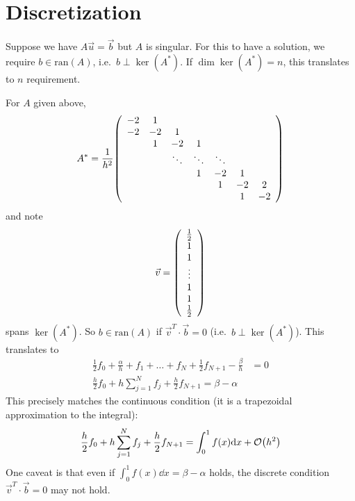 \documentclass{article}
\newcommand{\ran}{\text{ran}}
\begin{document}
    \section{Discretization}
        Suppose we have $A\vec{u} = \vec{b}$ but $A$ is singular.  For this to have a solution, we require $b \in \ran(A)$, i.e.~$b \perp \ker(A^*)$.  If $\dim\ker(A^*) = n$, this translates to $n$ requirement.

        For $A$ given above,
        \begin{align}
             A^* = \frac{1}{h^2}\qty(\begin{array}{ccccccc}
                    -2 & 1 & & & \\
                    -2 & -2 & 1 & & \\
                    & 1 & -2 & 1 \\
                    & & \ddots & \ddots & \ddots &  \\
                    & & & 1 & -2 & 1 \\
                    & & & & 1 & -2 & 2 \\
                    & & & & & 1 & -2
                \end{array})
        \end{align}
        and note
        \begin{align}
            \vec{v} = \qty(\begin{array}{c}
                \frac{1}{2} \\ 1 \\ 1 \\ \vdots \\ 1 \\ 1 \\ \frac{1}{2}
            \end{array})
        \end{align}
        spans $\ker(A^*)$.  So $b \in \ran(A)$ if $\vec{v}^T\cdot \vec{b} = 0$ (i.e.~$b \perp \ker(A^*)$).  This translates to
        \begin{align}
            \frac{1}{2}f_0 + \frac{\alpha}{h} + f_1 + \dots + f_N + \frac{1}{2}f_{N+1} - \frac{\beta}{h} &= 0 \\
            \frac{h}{2}f_0 + h\sum_{j=1}^Nf_j + \frac{h}{2}f_{N+1} = \beta - \alpha
        \end{align}
        This precisely matches the continuous condition (it is a trapezoidal approximation to the integral):
        \begin{align}
            \frac{h}{2}f_0 + h\sum_{j=1}^Nf_j + \frac{h}{2}f_{N+1} = \int_0^1 f(x) \dd x + \order{h^2}
        \end{align}
        One caveat is that even if $\int_0^1 f(x) \dd x = \beta - \alpha$ holds, the discrete condition $\vec{v}^T \cdot \vec{b} = 0$ may not hold.
\end{document}
